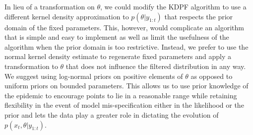 \documentclass{elsarticle}
\newcommand{\danny}[1]{{\color{blue}DANNY: #1}}
\begin{document}


In lieu of a transformation on $\theta$, we could modify the KDPF algorithm to use a different kernel density approximation to $p(\theta|y_{1:t})$ that respects the prior domain of the fixed parameters. This, however, would complicate an algorithm that is simple and easy to implement as well as limit the usefulness of the algorithm when the prior domain is too restrictive. Instead, we prefer to use the normal kernel density estimate to regenerate fixed parameters and apply a transformation to $\theta$ that does not influence the filtered distribution in any way. We suggest using log-normal priors on positive elements of $\theta$ as opposed to uniform priors on bounded parameters. This allows us to use prior knowledge of the epidemic to encourage points to lie in a reasonable range while retaining flexibility in the event of model mis-specification either in the likelihood or the prior and lets the data play a greater role in dictating the evolution of $p(x_t,\theta|y_{1:t})$.
\end{document}
